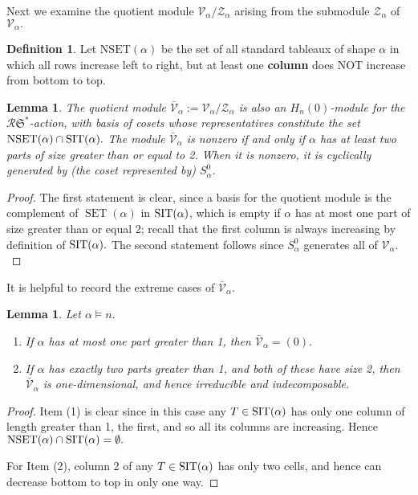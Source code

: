 \documentclass[12pt,letterpaper]{amsart}
\newtheorem{lemma}[theorem]{Lemma}
\theoremstyle{definition}
\newtheorem{definition}[theorem]{Definition}
\newcommand{\rdI}{\mathcal{R}\mathfrak{S}^*}
\newcommand{\SET}{\ensuremath{\operatorname{SET}}} \newcommand{\NSET}{\ensuremath{\operatorname{NSET}}}\newcommand{\SRCT}{\ensuremath{\operatorname{SRCT}}}
\newcommand{\hn}{H_n(0)}
\begin{document}
Next we examine   the quotient module ${\mathcal{V}_\alpha/\mathcal{Z}_\alpha}$ arising from the submodule $\mathcal{Z}_\alpha$  of $\mathcal{V}_\alpha.$ 

\begin{definition}\label{def:NSET} Let $\mathrm{NSET}(\alpha)$ be the set of all standard  tableaux of shape $\alpha$ in which all  rows increase left to right, but at least one \textbf{column} does NOT increase from bottom to top. 
\end{definition}

\begin{lemma}\label{lem:rdIquotientmodule} The quotient module $\mathcal{\bar V}_{\alpha}:={\mathcal{V}_\alpha/\mathcal{Z}_\alpha}$ is also an 
 $\hn$-module  for the $\rdI$-action, with basis of cosets whose  representatives constitute the set $\NSET(\alpha)\cap \SIT(\alpha).$  The module $\mathcal{\bar V}_{\alpha}$ is nonzero if and only if $\alpha$ has at least two parts of size greater than or equal to 2. When it is nonzero, it is cyclically generated by (the coset represented by) $S^0_\alpha.$
\end{lemma}

\begin{proof} The first statement is  clear, since a basis for the quotient module is the complement of $\SET(\alpha)$ in $\operatorname{SIT}(\alpha)$, which is empty if $\alpha$ has at most one part of size greater than or equal 2; recall that the first column is always increasing by definition of $\operatorname{SIT}(\alpha).$  The second statement follows since $S^0_\alpha$ generates all of $\mathcal{V}_\alpha.$
\end{proof}

It is helpful to record the extreme cases of $\mathcal{\bar V}_\alpha.$ 
\begin{lemma}\label{lem:extremes} Let $\alpha\vDash n.$  
\begin{enumerate}
\item  If $\alpha$ has at most one part greater than 1, then 
$\mathcal{\bar V}_\alpha=(0).$
\item If $\alpha$ has exactly two parts greater than 1, and both of these have size 2, then 
$\mathcal{\bar V}_\alpha$ is one-dimensional, and hence irreducible and  indecomposable. 
\end{enumerate}
\end{lemma}

\begin{proof} Item (1) is clear since in this case any $T\in \operatorname{SIT}(\alpha)$ has only one column of length greater than 1, the first, and so all its columns are increasing.  Hence $\NSET(\alpha)\cap\SIT(\alpha)=\emptyset.$

For Item (2), column 2 of any $T\in \operatorname{SIT}(\alpha)$ has only two cells, and hence can  decrease bottom to top in only one way. 
\end{proof}
\end{document}
